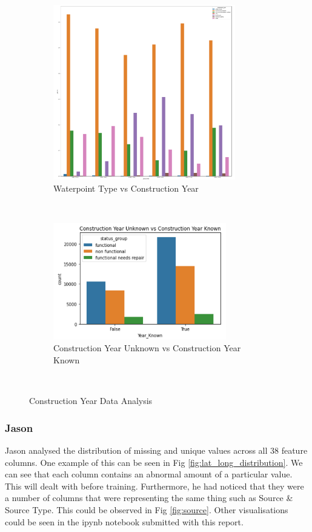 \documentclass[conference]{IEEEtran}
\begin{document}
\begin{figure}[t!]
    \centering
    \begin{subfigure}[t]{0.5\textwidth}
      \centering
      \includegraphics[height=3in]{figures/tom_da_construction_year_1}
      \caption{Waterpoint Type vs Construction Year}
    \end{subfigure}%
    ~
    \begin{subfigure}[t]{0.5\textwidth}
      \centering
      \includegraphics[height=2in]{figures/tom_unknown_cy.png}
      \caption{Construction Year Unknown vs Construction Year Known}
    \end{subfigure}
    ~
    \caption{Construction Year Data Analysis}
    \label{fig:construction_year}
\end{figure}

\subsubsection{Jason}

Jason analysed the distribution of missing and unique values across all 38 feature columns. One example of this can be seen in Fig \ref{fig:lat_long_distribution}. We can see that each column contains an abnormal amount of a particular value. This will dealt with before training. Furthermore, he had noticed that they were a number of columns that were representing the same thing such as Source \& Source Type. This could be observed in Fig \ref{fig:source}. Other visualisations could be seen in the ipynb notebook submitted with this report.
\end{document}
